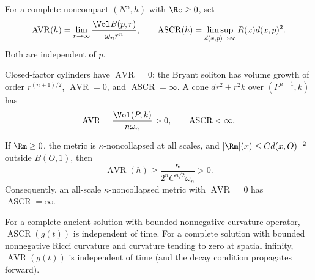 \begin{definition}
\label{def:chow-iii-asymptotic-ratios}
For a complete noncompact $(N^n,h)$ with $\Rc\ge0$, set
\[
\operatorname{AVR}(h)=\lim_{r\to\infty}\frac{\Vol B(p,r)}{\omega_n r^n},
\qquad
\operatorname{ASCR}(h)=\limsup_{d(x,p)\to\infty}R(x)d(x,p)^2.
\]
Both are independent of $p$.
\end{definition}

\begin{example}
\label{ex:chow-iii-avr-ascr-examples}
Closed-factor cylinders have $\operatorname{AVR}=0$; the Bryant soliton has
volume growth of order $r^{(n+1)/2}$, $\operatorname{AVR}=0$, and
$\operatorname{ASCR}=\infty$.  A cone $dr^2+r^2k$ over $(P^{n-1},k)$ has
\[
\operatorname{AVR}=\frac{\Vol(P,k)}{n\omega_n}>0,
\qquad \operatorname{ASCR}<\infty.
\]
\end{example}

\begin{proposition}
\label{prop:chow-iii-avr-from-ascr}
If $\Rm\ge0$, the metric is $\kappa$-noncollapsed at all scales, and
$|\Rm|(x)\le Cd(x,O)^{-2}$ outside $B(O,1)$, then
\[
\operatorname{AVR}(h)\ge\frac{\kappa}{2^nC^{n/2}\omega_n}>0.
\]
Consequently, an all-scale $\kappa$-noncollapsed metric with $\operatorname{AVR}=0$
has $\operatorname{ASCR}=\infty$.
\end{proposition}

\begin{theorem}
\label{thm:chow-iii-ascr-avr-time-invariance}
For a complete ancient solution with bounded nonnegative curvature operator,
$\operatorname{ASCR}(g(t))$ is independent of time.  For a complete solution
with bounded nonnegative Ricci curvature and curvature tending to zero at
spatial infinity, $\operatorname{AVR}(g(t))$ is independent of time (and the
decay condition propagates forward).
\end{theorem}

